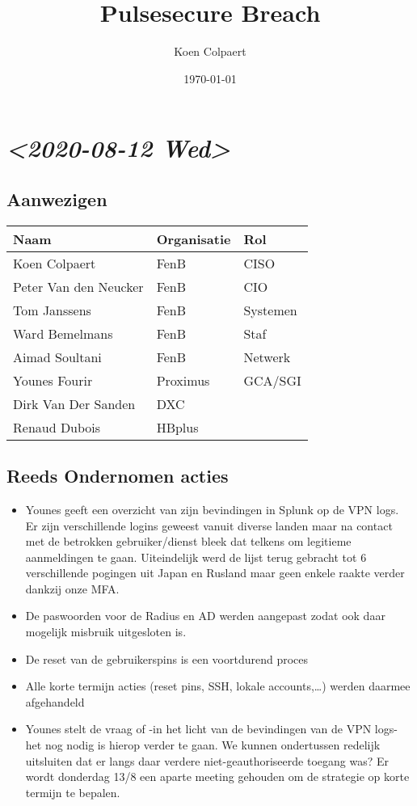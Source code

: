 \documentclass[11pt]{article}
\author{Koen Colpaert}
\date{\today}
\title{Pulsesecure Breach}
\begin{document}
\maketitle

\section{\textit{<2020-08-12 Wed>}}
\label{sec:org2c7a223}

\subsection{Aanwezigen}
\label{sec:orgbe7dcd2}

\begin{center}
\begin{tabular}{lll}
Naam & Organisatie & Rol\\
\hline
Koen Colpaert & FenB & CISO\\
Peter Van den Neucker & FenB & CIO\\
Tom Janssens & FenB & Systemen\\
Ward Bemelmans & FenB & Staf\\
Aimad Soultani & FenB & Netwerk\\
Younes Fourir & Proximus & GCA/SGI\\
Dirk Van Der Sanden & DXC & \\
Renaud Dubois & HBplus & \\
\end{tabular}
\end{center}

\subsection{Reeds Ondernomen acties}
\label{sec:orgbef5ad1}
\begin{itemize}
\item Younes geeft een overzicht van zijn bevindingen in Splunk op de VPN logs. Er zijn verschillende logins geweest vanuit diverse landen maar na contact met de betrokken gebruiker/dienst bleek dat telkens om legitieme aanmeldingen te gaan. Uiteindelijk werd de lijst terug gebracht tot 6 verschillende pogingen uit Japan en Rusland maar geen enkele raakte verder dankzij onze MFA.
\item De paswoorden voor de Radius en AD werden aangepast zodat ook daar mogelijk misbruik uitgesloten is.
\item De reset van de gebruikerspins is een voortdurend proces
\item Alle korte termijn acties (reset pins, SSH, lokale accounts,\ldots{}) werden daarmee afgehandeld
\item Younes stelt de vraag of -in het licht van de bevindingen van de VPN logs- het nog nodig is hierop verder te gaan. We kunnen ondertussen redelijk uitsluiten dat er langs daar verdere niet-geauthoriseerde toegang was? Er wordt donderdag 13/8 een aparte meeting gehouden om de strategie op korte termijn te bepalen.
\end{itemize}
\end{document}
